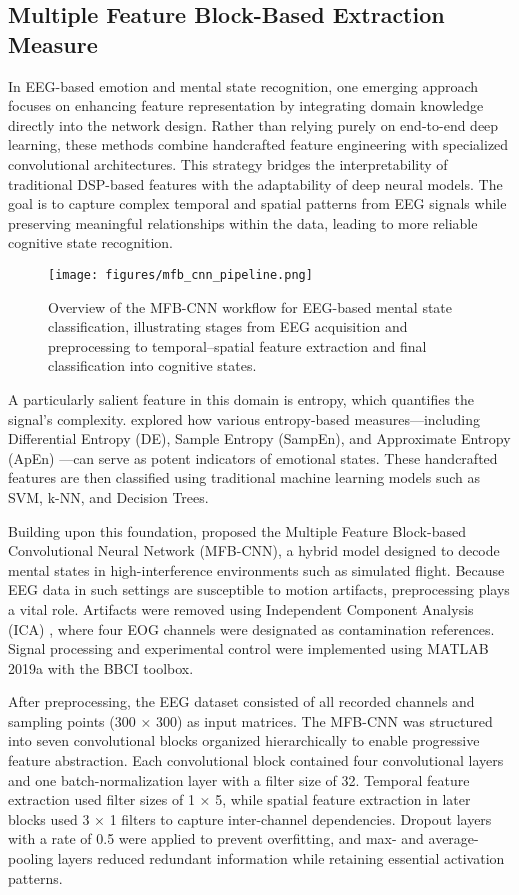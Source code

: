\documentclass[conference]{IEEEtran}
\begin{document}
\subsection{Multiple Feature Block-Based Extraction Measure}
In EEG-based emotion and mental state recognition, one emerging approach focuses on enhancing feature representation by integrating domain knowledge directly into the network design. Rather than relying purely on end-to-end deep learning, these methods combine handcrafted feature engineering with specialized convolutional architectures. This strategy bridges the interpretability of traditional DSP-based features with the adaptability of deep neural models. The goal is to capture complex temporal and spatial patterns from EEG signals while preserving meaningful relationships within the data, leading to more reliable cognitive state recognition.

\begin{figure}[H]
    \centering
    \texttt{[image: figures/mfb\_cnn\_pipeline.png]}
    \caption{Overview of the MFB-CNN workflow for EEG-based mental state classification, illustrating stages from EEG acquisition and preprocessing to temporal–spatial feature extraction and final classification into cognitive states.}
    \label{fig:mfb_cnn_pipeline}
\end{figure}

A particularly salient feature in this domain is entropy, which quantifies the signal’s complexity. \cite{b3} explored how various entropy-based measures—including Differential Entropy (DE), Sample Entropy (SampEn), and Approximate Entropy (ApEn) \cite{b3}—can serve as potent indicators of emotional states. These handcrafted features are then classified using traditional machine learning models such as SVM, k-NN, and Decision Trees.

Building upon this foundation, \cite{b4} proposed the Multiple Feature Block-based Convolutional Neural Network (MFB-CNN), a hybrid model designed to decode mental states in high-interference environments such as simulated flight. Because EEG data in such settings are susceptible to motion artifacts, preprocessing plays a vital role. Artifacts were removed using Independent Component Analysis (ICA) \cite{b4}, where four EOG channels were designated as contamination references. Signal processing and experimental control were implemented using MATLAB 2019a with the BBCI toolbox.

After preprocessing, the EEG dataset consisted of all recorded channels and sampling points (300 × 300) as input matrices. The MFB-CNN was structured into seven convolutional blocks organized hierarchically to enable progressive feature abstraction. Each convolutional block contained four convolutional layers and one batch-normalization layer with a filter size of 32. Temporal feature extraction used filter sizes of 1 × 5, while spatial feature extraction in later blocks used 3 × 1 filters to capture inter-channel dependencies. Dropout layers with a rate of 0.5 were applied to prevent overfitting, and max- and average-pooling layers reduced redundant information while retaining essential activation patterns.
\end{document}
